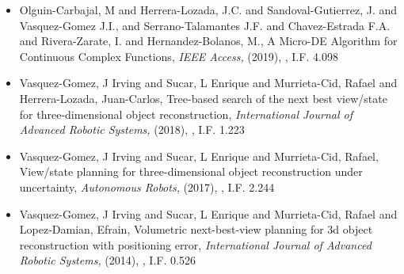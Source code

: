\begin{itemize}
\item Olguin-Carbajal, M and Herrera-Lozada, J.C. and Sandoval-Gutierrez, J. and Vasquez-Gomez J.I., and Serrano-Talamantes J.F. and Chavez-Estrada F.A. and Rivera-Zarate, I. and Hernandez-Bolanos, M., A Micro-DE Algorithm for Continuous Complex Functions,\textit{ IEEE Access,} (2019), \href{https://doi.org/10.1109/ACCESS.2019.2954296} {\faFilePdfO}, I.F. 4.098 
\item Vasquez-Gomez, J Irving and Sucar, L Enrique and Murrieta-Cid, Rafael and Herrera-Lozada, Juan-Carlos, Tree-based search of the next best view/state for three-dimensional object reconstruction,\textit{ International Journal of Advanced Robotic Systems,} (2018), \href{https://journals.sagepub.com/doi/10.1177/1729881418754575} {\faFilePdfO}, I.F. 1.223 
\item Vasquez-Gomez, J Irving and Sucar, L Enrique and Murrieta-Cid, Rafael, View/state planning for three-dimensional object reconstruction under uncertainty,\textit{ Autonomous Robots,} (2017), \href{https://doi.org/10.1007/s10514-015-9531-3} {\faFilePdfO}, I.F. 2.244 
\item Vasquez-Gomez, J Irving and Sucar, L Enrique and Murrieta-Cid, Rafael and Lopez-Damian, Efrain, Volumetric next-best-view planning for 3d object reconstruction with positioning error,\textit{ International Journal of Advanced Robotic Systems,} (2014), \href{https://doi.org/10.5772%2F58759} {\faFilePdfO}, I.F. 0.526 
\end{itemize} 
